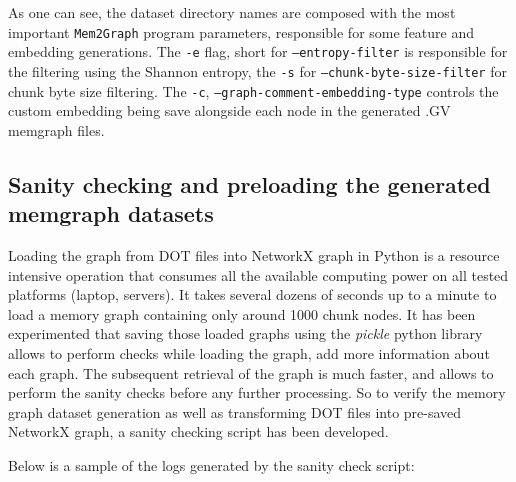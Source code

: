 As one can see, the dataset directory names are composed with the most important \texttt{Mem2Graph} program parameters, responsible for some feature and embedding generations. The \texttt{-e} flag, short for \texttt{--entropy-filter} is responsible for the filtering using the Shannon entropy, the \texttt{-s} for \texttt{--chunk-byte-size-filter} for chunk byte size filtering. The \texttt{-c}, \texttt{--graph-comment-embedding-type} controls the custom embedding being save alongside each node in the generated .GV memgraph files.

\subsection{Sanity checking and preloading the generated memgraph datasets}
Loading the graph from DOT files into NetworkX graph in Python is a resource intensive operation that consumes all the available computing power on all tested platforms (laptop, servers). It takes several dozens of seconds up to a minute to load a memory graph containing only around 1000 chunk nodes. It has been experimented that saving those loaded graphs using the \textit{pickle} python library allows to perform checks while loading the graph, add more information about each graph. The subsequent retrieval of the graph is much faster, and allows to perform the sanity checks before any further processing. So to verify the memory graph dataset generation as well as transforming DOT files into pre-saved NetworkX graph, a sanity checking script has been developed.

Below is a sample of the logs generated by the sanity check script:

